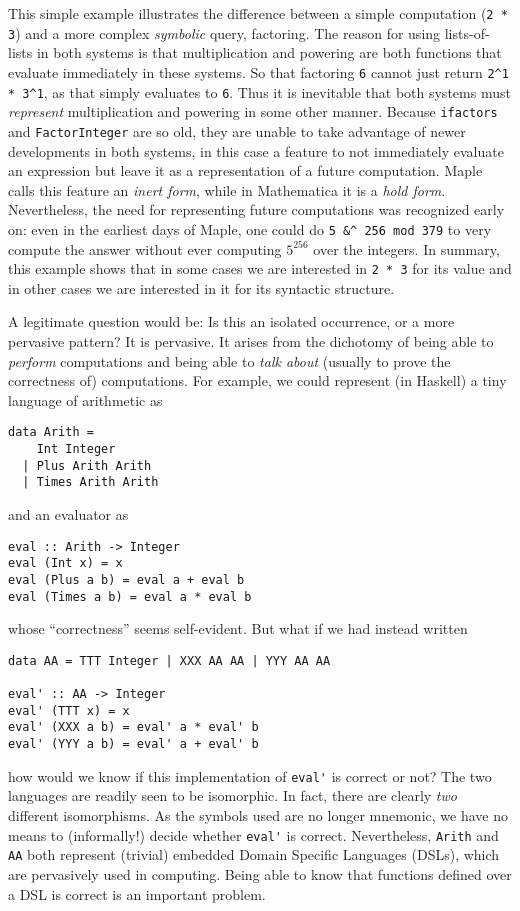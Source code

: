 \documentclass[fleqn]{llncs}
\begin{document}
This simple example illustrates the difference between a simple
computation (\texttt{2 * 3}) and a more complex \emph{symbolic} query,
factoring.  The reason for using lists-of-lists in both systems is
that multiplication and powering are both functions that evaluate
immediately in these systems.  So that factoring \texttt{6} cannot
just return \verb+2^1 * 3^1+, as that simply evaluates to \texttt{6}.
Thus it is inevitable that both systems must \emph{represent}
multiplication and powering in some other manner.  Because
\texttt{ifactors} and \texttt{FactorInteger} are so old, they are
unable to take advantage of newer developments in both systems,
in this case a feature to not immediately evaluate an expression
but leave it as a representation of a future computation.
Maple calls this feature
an \emph{inert form}, while in Mathematica it is a \emph{hold form}.
Nevertheless, the need for representing future computations was
recognized early on: even in
the earliest days of Maple, one could do \texttt{5 \&\textasciicircum
256 mod 379} to very compute the answer without ever computing
$5^{256}$ over the integers.  In summary, this example shows that in
some cases we are interested in \texttt{2 * 3} for its value and in
other cases we are interested in it for its syntactic structure.

A legitimate question would be: Is this an isolated occurrence, or a
more pervasive pattern? It is pervasive. It arises from the dichotomy
of being able to \emph{perform} computations and being able to
\emph{talk about} (usually to prove the correctness of) computations.
For example, we could represent (in Haskell) a tiny language of
arithmetic as
\begin{lstlisting}
data Arith = 
    Int Integer 
  | Plus Arith Arith 
  | Times Arith Arith
\end{lstlisting}
\noindent and an evaluator as
\begin{lstlisting}
eval :: Arith -> Integer
eval (Int x) = x
eval (Plus a b) = eval a + eval b
eval (Times a b) = eval a * eval b
\end{lstlisting}
\noindent whose ``correctness'' seems self-evident.  But what if we had
instead written
\begin{lstlisting}
data AA = TTT Integer | XXX AA AA | YYY AA AA

eval' :: AA -> Integer
eval' (TTT x) = x
eval' (XXX a b) = eval' a * eval' b
eval' (YYY a b) = eval' a + eval' b
\end{lstlisting}
how would we know if this implementation of \lstinline|eval'| is correct
or not?  The two languages are readily seen to be isomorphic.  In fact,
there are clearly \emph{two} different isomorphisms. As the symbols used are
no longer mnemonic, we have no means to (informally!) decide whether
\lstinline|eval'| is correct.  Nevertheless, \lstinline|Arith| and
\lstinline|AA| both represent (trivial) embedded Domain Specific Languages
(DSLs), which are pervasively used in computing. Being able to know that
functions defined over a DSL is correct is an important problem.
\end{document}
